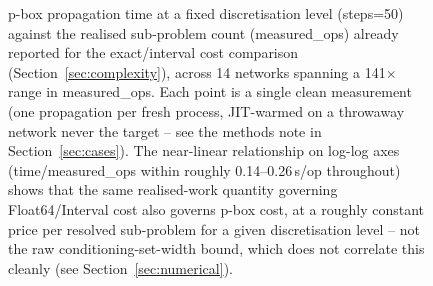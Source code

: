 
\begin{figure}[t]\centering
{}
\caption{p-box propagation time at a fixed discretisation level (steps=50) against the realised
sub-problem count (measured\_ops) already reported for the exact/interval cost comparison
(Section~\ref{sec:complexity}), across 14 networks spanning a 141$\times$ range in measured\_ops.
Each point is a single clean measurement (one propagation per fresh process, JIT-warmed on a
throwaway network never the target -- see the methods note in Section~\ref{sec:cases}). The
near-linear relationship on log-log axes (time/measured\_ops within roughly 0.14--0.26\,s/op
throughout) shows that the same realised-work quantity governing Float64/Interval cost also
governs p-box cost, at a roughly constant price per resolved sub-problem for a given
discretisation level -- not the raw conditioning-set-width bound, which does not correlate this
cleanly (see Section~\ref{sec:numerical}).}
\label{fig:pbox_cost}
\end{figure}
